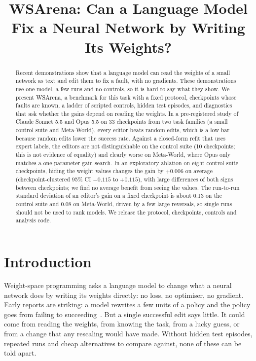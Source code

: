 \documentclass[conference]{IEEEtran}
\begin{document}
\title{WSArena: Can a Language Model Fix a Neural Network by Writing Its Weights?}
\author{}
\maketitle

\begin{abstract}
Recent demonstrations show that a language model can read the weights of a small network as text and edit them to fix a fault, with no gradients. These demonstrations use one model, a few runs and no controls, so it is hard to say what they show. We present WSArena, a benchmark for this task with a fixed protocol, checkpoints whose faults are known, a ladder of scripted controls, hidden test episodes, and diagnostics that ask whether the gains depend on reading the weights. In a pre-registered study of Claude Sonnet 5.5 and Opus 5.5 on 33 checkpoints from two task families (a small control suite and Meta-World), every editor beats random edits, which is a low bar because random edits lower the success rate. Against a closed-form refit that uses expert labels, the editors are not distinguishable on the control suite (10 checkpoints; this is not evidence of equality) and clearly worse on Meta-World, where Opus only matches a one-parameter gain search. In an exploratory ablation on eight control-suite checkpoints, hiding the weight values changes the gain by $+0.006$ on average (checkpoint-clustered 95\% CI $-0.115$ to $+0.115$), with large differences of both signs between checkpoints; we find no average benefit from seeing the values. The run-to-run standard deviation of an editor's gain on a fixed checkpoint is about 0.13 on the control suite and 0.08 on Meta-World, driven by a few large reversals, so single runs should not be used to rank models. We release the protocol, checkpoints, controls and analysis code.
\end{abstract}

\section{Introduction}
Weight-space programming asks a language model to change what a neural network does by writing its weights directly: no loss, no optimiser, no gradient. Early reports are striking: a model rewrites a few units of a policy and the policy goes from failing to succeeding~\cite{takehi2026sparks}. But a single successful edit says little. It could come from reading the weights, from knowing the task, from a lucky guess, or from a change that any rescaling would have made. Without hidden test episodes, repeated runs and cheap alternatives to compare against, none of these can be told apart.
\end{document}
